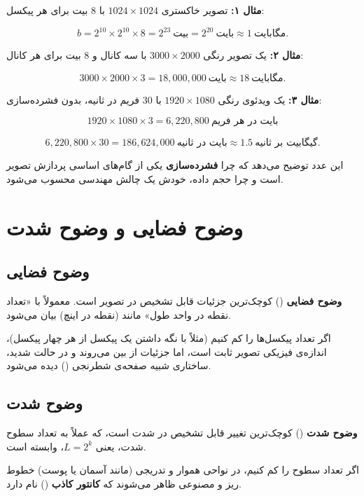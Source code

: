 \documentclass[11pt,a4paper]{article}
\begin{document}
	\textbf{مثال ۱:} تصویر خاکستری $1024\times1024$ با $8$ بیت برای هر پیکسل:
	
	\[
	b=2^{10}\times2^{10}\times8=2^{23}\ \text{بیت}=2^{20}\ \text{بایت}\approx 1\ \text{مگابایت}.
	\]
	
	\textbf{مثال ۲:} یک تصویر رنگی $3000\times2000$ با سه کانال و $8$ بیت برای هر کانال:
	
	\[
	3000\times2000\times3=18{,}000{,}000\ \text{بایت}\approx 18\ \text{مگابایت}.
	\]
	
	\textbf{مثال ۳:} یک ویدئوی رنگی $1920\times1080$ با $30$ فریم در ثانیه، بدون فشرده‌سازی:
	
	\[
	1920\times1080\times3=6{,}220{,}800\ \text{بایت در هر فریم}
	\]
	
	\[
	6{,}220{,}800\times30=186{,}624{,}000\ \text{بایت در ثانیه}
	\approx 1.5\ \text{گیگابیت بر ثانیه}.
	\]
	
	این عدد توضیح می‌دهد که چرا \textbf{فشرده‌سازی} یکی از گام‌های اساسی پردازش تصویر است
	و چرا حجم داده، خودش یک چالش مهندسی محسوب می‌شود.
	
	
	\section{وضوح فضایی و وضوح شدت}
	
	\subsection{وضوح فضایی}
	
	\textbf{وضوح فضایی} () کوچک‌ترین جزئیات قابل تشخیص در تصویر است.
	معمولاً با «تعداد نقطه در واحد طول» مانند  (نقطه در اینچ) بیان می‌شود.
	
	اگر تعداد پیکسل‌ها را کم کنیم (مثلاً با نگه داشتن یک پیکسل از هر چهار پیکسل)،
	اندازه‌ی فیزیکی تصویر ثابت است، اما جزئیات از بین می‌روند و در حالت شدید،
	ساختاری شبیه صفحه‌ی شطرنجی () دیده می‌شود.
	
	\subsection{وضوح شدت}
	
	\textbf{وضوح شدت} () کوچک‌ترین تغییر قابل تشخیص در شدت است،
	که عملاً به تعداد سطوح شدت، یعنی $L=2^k$، وابسته است.
	
	اگر تعداد سطوح را کم کنیم، در نواحی هموار و تدریجی (مانند آسمان یا پوست) خطوط ریز و
	مصنوعی ظاهر می‌شوند که \textbf{کانتور کاذب} () نام دارد.
	
\end{document}
